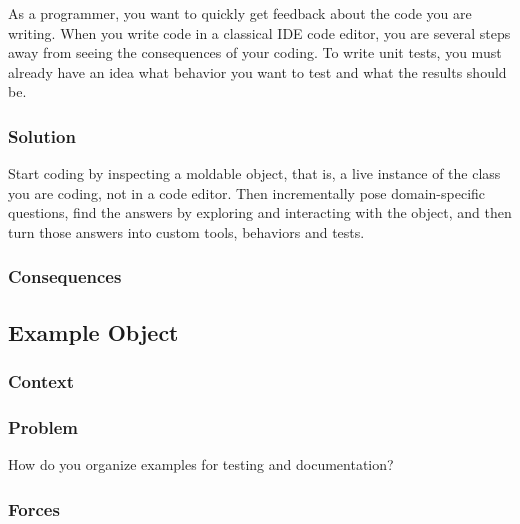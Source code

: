\documentclass[sigconf]{acmart}
\begin{document}
As a programmer, you want to quickly get feedback about the code you are writing.
When you write code in a classical IDE code editor, you are several steps away from seeing the consequences of your coding.
To write unit tests, you must already have an idea what behavior you want to test and what the results should be.

\subsubsection*{Solution}

Start coding by inspecting a moldable object, that is, a live instance of the class you are coding, not in a code editor.
Then incrementally pose domain-specific questions, find the answers by exploring and interacting with the object, and then turn those answers into custom tools, behaviors and tests.






\subsubsection*{Consequences}

\todo{}




\subsection*{Example Object}\label{pat:exampleObject}


\subsubsection*{Context}
\subsubsection*{Problem}

How do you organize examples for testing and documentation?

\subsubsection*{Forces}
\end{document}
